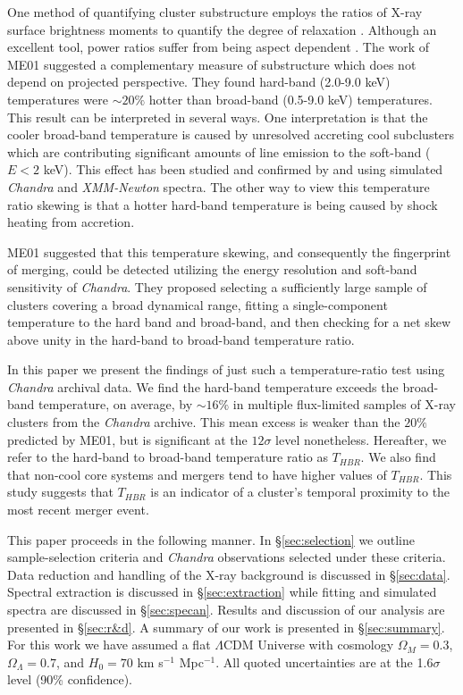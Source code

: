 \documentclass{emulateapj}
\begin{document}
One method of quantifying cluster substructure employs the ratios of
X-ray surface brightness moments to quantify the degree of relaxation
\citep{1995ApJ...452..522B, 1996ApJ...458...27B,
2005ApJ...624..606J}. Although an excellent tool, power ratios suffer
from being aspect dependent \citep{2007arXiv0708.1518J, VV08}. The
work of ME01 suggested a complementary measure of substructure which
does not depend on projected perspective. They found hard-band
(2.0-9.0 keV) temperatures were $\sim 20\%$ hotter than broad-band
(0.5-9.0 keV) temperatures. This result can be interpreted in several
ways. One interpretation is that the cooler broad-band temperature is
caused by unresolved accreting cool subclusters which are contributing
significant amounts of line emission to the soft-band ($E < 2$
keV). This effect has been studied and confirmed by
\cite{2004MNRAS.354...10M} and \cite{2006ApJ...640..710V} using
simulated {\it Chandra} and {\textit{XMM-Newton}} spectra. The other
way to view this temperature ratio skewing is that a hotter hard-band
temperature is being caused by shock heating from accretion.

ME01 suggested that this temperature skewing, and consequently the
fingerprint of merging, could be detected utilizing the energy
resolution and soft-band sensitivity of {\it Chandra}. They proposed
selecting a sufficiently large sample of clusters covering a broad
dynamical range, fitting a single-component temperature to the hard
band and broad-band, and then checking for a net skew above unity in
the hard-band to broad-band temperature ratio.

In this paper we present the findings of just such a temperature-ratio
test using {\it Chandra} archival data. We find the hard-band
temperature exceeds the broad-band temperature, on average, by
$\sim16\%$ in multiple flux-limited samples of X-ray clusters from the
{\it Chandra} archive. This mean excess is weaker than the $20\%$
predicted by ME01, but is significant at the $12\sigma$ level
nonetheless. Hereafter, we refer to the hard-band to broad-band
temperature ratio as $T_{HBR}$. We also find that non-cool core
systems and mergers tend to have higher values of $T_{HBR}$. This
study suggests that $T_{HBR}$ is an indicator of a cluster's temporal
proximity to the most recent merger event.

This paper proceeds in the following manner. In \S\ref{sec:selection}
we outline sample-selection criteria and {\it Chandra}
observations selected under these criteria. Data reduction and
handling of the X-ray background is discussed in
\S\ref{sec:data}. Spectral extraction is discussed in
\S\ref{sec:extraction} while fitting and simulated spectra are
discussed in \S\ref{sec:specan}. Results and discussion of our
analysis are presented in \S\ref{sec:r&d}. A summary of our work
is presented in \S\ref{sec:summary}. For this work we have assumed a
flat $\Lambda$CDM Universe with cosmology $\Omega_{M} = 0.3$,
$\Omega_{\Lambda} = 0.7$, and $H_{0} = 70$ km s$^{-1}$ Mpc$^{-1}$. All
quoted uncertainties are at the 1.6$\sigma$ level (90\% confidence).
\end{document}
